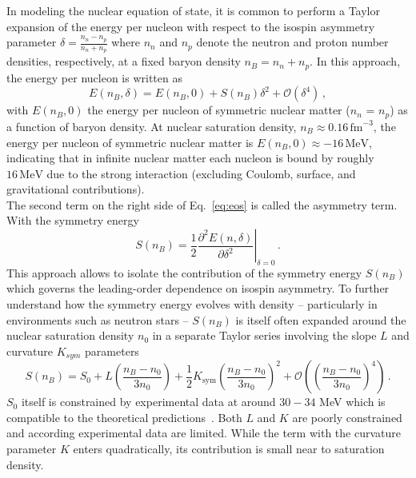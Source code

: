 In modeling the nuclear equation of state, it is common to perform a Taylor expansion of the energy per nucleon with respect to the isospin asymmetry parameter $\delta = \frac{n_n -n_p}{n_n + n_p}$ where $n_n$ and $n_p$ denote the neutron and proton number densities, respectively, at a fixed baryon density $n_B = n_n +n_p$. In this approach, the energy per nucleon is written as
\begin{equation}\label{eq:eos}
E(n_B,\delta)=E(n_B,0)+S(n_B)\delta^2+\mathcal{O}(\delta^4)\, ,
\end{equation}
with $E(n_B,0)$ the energy per nucleon of symmetric nuclear matter ($n_n$ = $n_p$) as a function of baryon density. At nuclear saturation density, \(n_B \approx 0.16\,\mathrm{fm}^{-3}\), the energy per nucleon of symmetric nuclear matter is \(E(n_B,0) \approx -16\,\mathrm{MeV}\), indicating that in infinite nuclear matter each nucleon is bound by roughly \(16\,\mathrm{MeV}\) due to the strong interaction (excluding Coulomb, surface, and gravitational contributions).\\
The second term on the right side of Eq.~\ref{eq:eos}  is called the asymmetry term. With the symmetry energy
\begin{equation}
S(n_B) = \frac{1}{2} \left. \frac{\partial^2 E(n, \delta)}{\partial \delta^2} \right|_{\delta = 0} \, .
\end{equation}
This approach allows to isolate the contribution of the symmetry energy $S(n_B)$  which governs the leading-order dependence on isospin asymmetry.\newline
To further understand how the symmetry energy evolves with density -- particularly in environments such as neutron stars -- $S(n_B) $ is itself often expanded around the nuclear saturation density $n_0$ in a separate Taylor series involving the slope $L$ and curvature $K_{sym}$ parameters
\begin{equation}\label{eq:sy_ene}
S(n_B) = S_0 + L \left( \frac{n_B - n_0}{3n_0} \right) + \frac{1}{2} K_{\text{sym}} \left( \frac{n_B - n_0}{3n_0} \right)^2 + \mathcal{O}\left(\left( \frac{n_B - n_0}{3n_0}\right)^4 \right) \, .
\end{equation}
$S_0$ itself is constrained by experimental data at around $30-34$ MeV which is compatible to the theoretical predictions~\cite{roca2013electric,tsang2012constraints,lattimer2023constraints}. Both $L$ and $K$ are poorly constrained and according experimental data are limited. While the term with the curvature parameter $K$ enters quadratically, its contribution is small near to saturation density.\newline
